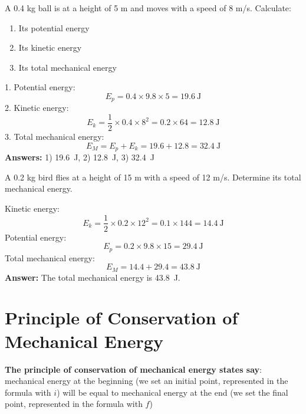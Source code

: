 \begin{exercise}
    A 0.4 kg ball is at a height of 5 m and moves with a speed of 8 m/s. Calculate:
    \begin{enumerate}
        \item Its potential energy
        \item Its kinetic energy
        \item Its total mechanical energy
    \end{enumerate}
    \begin{solu}
        1. Potential energy:
        \[
            E_p = 0.4 \times 9.8 \times 5 = \qty{19.6}{\joule}
        \]
        2. Kinetic energy:
        \[
            E_k = \frac{1}{2} \times 0.4 \times 8^2 = 0.2 \times 64 = \qty{12.8}{\joule}
        \]
        3. Total mechanical energy:
        \[
            E_M = E_p + E_k = 19.6 + 12.8 = \qty{32.4}{\joule}
        \]
        \textbf{Answers:} 1) \qty{19.6}{\joule}, 2) \qty{12.8}{\joule}, 3) \qty{32.4}{\joule}
    \end{solu}
\end{exercise}

\begin{exercise}
    A 0.2 kg bird flies at a height of 15 m with a speed of 12 m/s. Determine its total mechanical energy.
    \begin{solu}
        Kinetic energy:
        \[
            E_k = \frac{1}{2} \times 0.2 \times 12^2 = 0.1 \times 144 = \qty{14.4}{\joule}
        \]
        Potential energy:
        \[
            E_p = 0.2 \times 9.8 \times 15 = \qty{29.4}{\joule}
        \]
        Total mechanical energy:
        \[
            E_M = 14.4 + 29.4 = \qty{43.8}{\joule}
        \]
        \textbf{Answer:} The total mechanical energy is \qty{43.8}{\joule}.
    \end{solu}
\end{exercise}


\section{Principle of Conservation of Mechanical Energy}


\begin{dBox}
    \textbf{The principle of conservation of mechanical energy states say}: mechanical energy at the beginning (we set an initial point, represented in the formula with \( i \)) will be equal to mechanical energy at the end (we set the final point, represented in the formula with \( f \))
\end{dBox}

